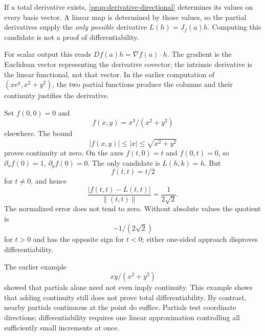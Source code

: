 If a total derivative exists, \cref{prop:derivative-directional} determines
its values on every basis vector. A linear map is determined by those
values, so the partial derivatives supply the \emph{only possible} derivative
$L(h)=J_f(a)h$. Computing this candidate is not a proof of differentiability.
\begin{center}
\end{center}
For scalar output this reads $Df(a)h=\nabla f(a)\cdot h$.
The gradient is the Euclidean vector representing the derivative covector;
the intrinsic derivative is the linear functional, not that vector.
In the earlier computation of $(xe^y,x^2+y^2)$, the two partial functions
produce the columns and their continuity justifies the derivative.

\begin{example}
\label{ex:continuous-partials-not-total}
Set $f(0,0)=0$ and
\[
f(x,y)=x^3/(x^2+y^2)
\]
 elsewhere. The bound
\[
|f(x,y)|\leq |x|\leq\sqrt{x^2+y^2}
\]
proves continuity at zero. On the axes $f(t,0)=t$ and $f(0,t)=0$,
so $\partial_xf(0)=1$, $\partial_yf(0)=0$. The only candidate is
$L(h,k)=h$. But
\[
f(t,t)=t/2
\]
 for $t\ne0$, and hence
\[
\frac{|f(t,t)-L(t,t)|}{\|(t,t)\|}=\frac1{2\sqrt2}.
\]
The normalized error does not tend to zero. Without absolute values the
quotient is
\[
-1/(2\sqrt2)
\]
 for $t>0$ and has the opposite sign for
$t<0$; either one-sided approach disproves differentiability.
\end{example}
The earlier example
\[
xy/(x^2+y^2)
\]
 showed that partials alone need not
even imply continuity. This example shows that adding continuity still
does not prove total differentiability. By contrast, nearby partials
continuous at the point do suffice. Partials test coordinate directions;
differentiability requires one linear approximation controlling all
sufficiently small increments at once.

